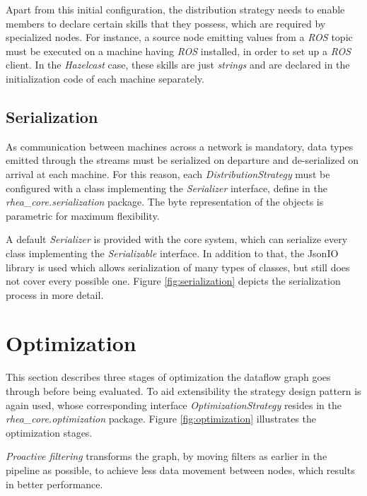 \documentclass[sigplan,review,anonymous]{acmart}
\begin{document}
Apart from this initial configuration, the distribution strategy needs to enable
members to declare certain skills that they possess, which are required by
specialized nodes. For instance, a source node emitting values from a
\textit{ROS} topic must be executed on a machine having \textit{ROS} installed,
in order to set up a \textit{ROS} client. In the \textit{Hazelcast} case, these
skills are just \textit{strings} and are declared in the initialization code of
each machine separately.

\subsection{Serialization}

As communication between machines across a network is mandatory, data types
emitted through the streams must be serialized on departure and de-serialized on
arrival at each machine. For this reason, each \textit{DistributionStrategy}
must be configured with a class implementing the \textit{Serializer} interface,
define in the \textit{rhea\_core.serialization} package. The byte representation
of the objects is parametric for maximum flexibility.

A default \textit{Serializer} is provided with the core system, which can
serialize every class implementing the \textit{Serializable} interface. In
addition to that, the JsonIO library is
used which allows serialization of many types of classes, but still does not
cover every possible one. Figure \ref{fig:serialization} depicts the
serialization process in more detail.


\section{Optimization} \label{sec:optimization}

This section describes three stages of optimization the dataflow graph goes
through before being evaluated. To aid extensibility  the strategy design
pattern is again used, whose corresponding interface
\textit{OptimizationStrategy} resides in the \textit{rhea\_core.optimization}
package. Figure \ref{fig:optimization} illustrates the optimization stages.


\textit{Proactive filtering} transforms the graph, by moving filters as earlier
in the pipeline as possible, to achieve less data movement between nodes, which
results in better performance.
\end{document}
